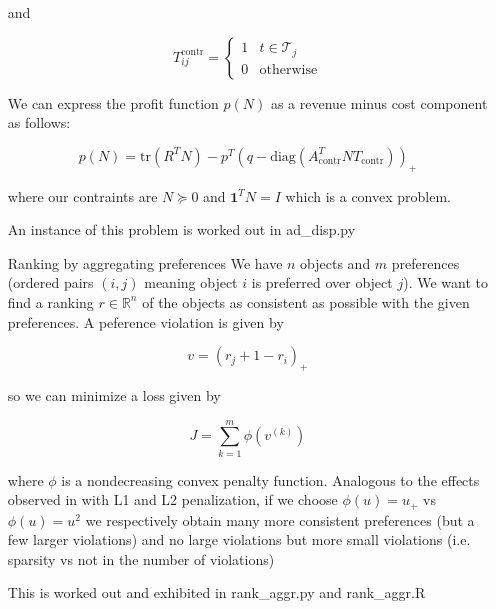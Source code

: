 \documentclass[12pt]{article}
\begin{document}
\begin{itemize}
  and

  $$T_{ij}^\text{contr} = \begin{cases}
    1 & t \in \mathcal{T}_j \\
    0 & \text{otherwise}
  \end{cases}$$

  We can express the profit function $p(N)$ as a revenue minus cost component as follows:

  $$p(N) = \text{tr}(R^T N) - p^T \left(q - \text{diag}(A_\text{contr}^T N T_\text{contr}) \right)_+$$

  where our contraints are $N \succeq 0$ and $\textbf{1}^T N = I$ which is a convex problem.

  An instance of this problem is worked out in ad_disp.py

\item[Ranking by aggregating preferences]
  We have $n$ objects and $m$ preferences (ordered pairs $(i,j)$ meaning object $i$ is preferred over object $j$). We want to find a ranking $r \in \mathbb{R}^n$ of the objects as consistent as possible with the given preferences. A peference violation is given by

  $$v = (r_j + 1 - r_i)_+$$

  so we can minimize a loss given by

  $$J = \sum_{k=1}^m \phi ( v^{(k)} )$$

  where $\phi$ is a nondecreasing convex penalty function. Analogous to the effects observed in with L1 and L2 penalization, if we choose $\phi(u) = u_+$ vs $\phi(u) = u^2$ we respectively obtain many more consistent preferences (but a few larger violations) and no large violations but more small violations (i.e. sparsity vs not in the number of violations)

  This is worked out and exhibited in rank_aggr.py and rank_aggr.R
  
\end{itemize}
\end{document}
